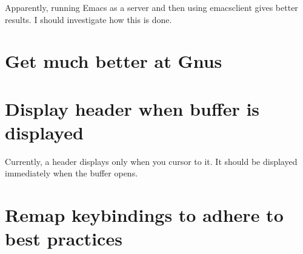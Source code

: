 \documentclass{default}
\begin{document}
Apparently, running Emacs as a server and then using emacsclient gives better results. I should
investigate how this is done.


\section{Get much better at Gnus}



\section{Display header when buffer is displayed}

Currently, a header displays only when you cursor to it. It should be displayed immediately when the
buffer opens.


\section{Remap keybindings to adhere to best practices}
\end{document}
